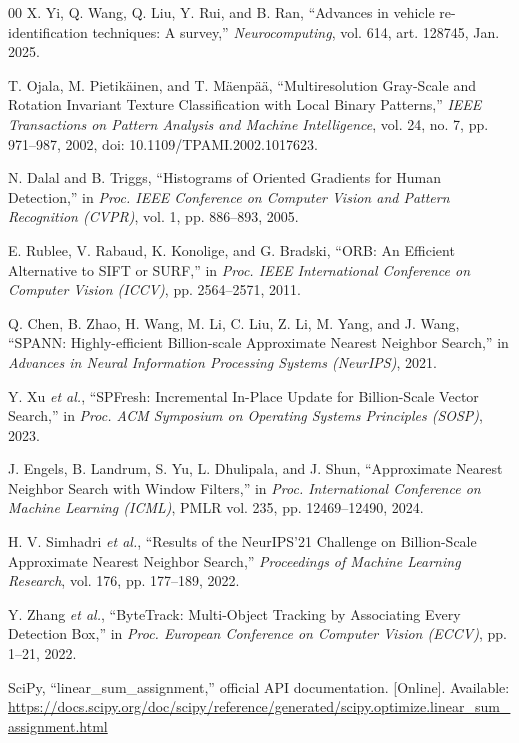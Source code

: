\documentclass[conference]{IEEEtran}
\begin{document}
\begin{thebibliography}{00}
X. Yi, Q. Wang, Q. Liu, Y. Rui, and B. Ran,
``Advances in vehicle re-identification techniques: A survey,''
\textit{Neurocomputing}, vol. 614, art. 128745, Jan. 2025.

T. Ojala, M. Pietik\"ainen, and T. M\"aenp\"a\"a,
``Multiresolution Gray-Scale and Rotation Invariant Texture Classification with Local Binary Patterns,''
\textit{IEEE Transactions on Pattern Analysis and Machine Intelligence},
vol. 24, no. 7, pp. 971--987, 2002, doi: 10.1109/TPAMI.2002.1017623.

N. Dalal and B. Triggs,
``Histograms of Oriented Gradients for Human Detection,''
in \textit{Proc. IEEE Conference on Computer Vision and Pattern Recognition (CVPR)},
vol. 1, pp. 886--893, 2005.

E. Rublee, V. Rabaud, K. Konolige, and G. Bradski,
``ORB: An Efficient Alternative to SIFT or SURF,''
in \textit{Proc. IEEE International Conference on Computer Vision (ICCV)},
pp. 2564--2571, 2011.

Q. Chen, B. Zhao, H. Wang, M. Li, C. Liu, Z. Li, M. Yang, and J. Wang,
``SPANN: Highly-efficient Billion-scale Approximate Nearest Neighbor Search,''
in \textit{Advances in Neural Information Processing Systems (NeurIPS)}, 2021.

Y. Xu \textit{et al.},
``SPFresh: Incremental In-Place Update for Billion-Scale Vector Search,''
in \textit{Proc. ACM Symposium on Operating Systems Principles (SOSP)}, 2023.

J. Engels, B. Landrum, S. Yu, L. Dhulipala, and J. Shun,
``Approximate Nearest Neighbor Search with Window Filters,''
in \textit{Proc. International Conference on Machine Learning (ICML)},
PMLR vol. 235, pp. 12469--12490, 2024.

H. V. Simhadri \textit{et al.},
``Results of the NeurIPS'21 Challenge on Billion-Scale Approximate Nearest Neighbor Search,''
\textit{Proceedings of Machine Learning Research},
vol. 176, pp. 177--189, 2022.

Y. Zhang \textit{et al.},
``ByteTrack: Multi-Object Tracking by Associating Every Detection Box,''
in \textit{Proc. European Conference on Computer Vision (ECCV)},
pp. 1--21, 2022.

SciPy,
``linear\_sum\_assignment,''
official API documentation. [Online].
Available: \url{https://docs.scipy.org/doc/scipy/reference/generated/scipy.optimize.linear_sum_assignment.html}


\end{thebibliography}
\end{document}

